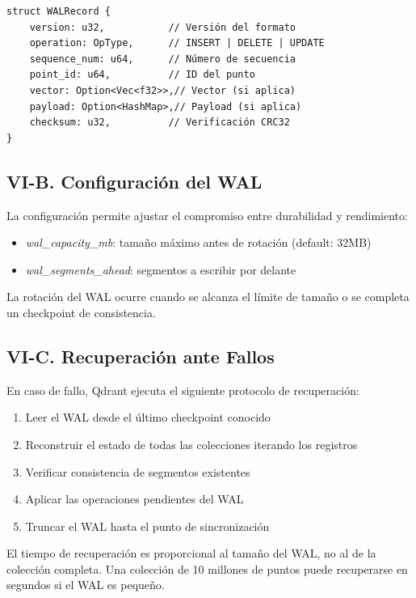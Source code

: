 \documentclass[conference]{IEEEtran}
\newcommand{\param}[1]{\textit{#1}}
\begin{document}
\begin{lstlisting}[caption={Estructura de registro WAL}]
struct WALRecord {
    version: u32,           // Versión del formato
    operation: OpType,      // INSERT | DELETE | UPDATE
    sequence_num: u64,      // Número de secuencia
    point_id: u64,          // ID del punto
    vector: Option<Vec<f32>>,// Vector (si aplica)
    payload: Option<HashMap>,// Payload (si aplica)
    checksum: u32,          // Verificación CRC32
}
\end{lstlisting}

\subsection{VI-B. Configuración del WAL}

La configuración permite ajustar el compromiso entre durabilidad y rendimiento:

\begin{itemize}
    \item \param{wal\_capacity\_mb}: tamaño máximo antes de rotación (default: 32MB)
    \item \param{wal\_segments\_ahead}: segmentos a escribir por delante
\end{itemize}

La rotación del WAL ocurre cuando se alcanza el límite de tamaño o se completa un checkpoint de consistencia.

\subsection{VI-C. Recuperación ante Fallos}

En caso de fallo, Qdrant ejecuta el siguiente protocolo de recuperación:

\begin{enumerate}
    \item Leer el WAL desde el último checkpoint conocido
    \item Reconstruir el estado de todas las colecciones iterando los registros
    \item Verificar consistencia de segmentos existentes
    \item Aplicar las operaciones pendientes del WAL
    \item Truncar el WAL hasta el punto de sincronización
\end{enumerate}

El tiempo de recuperación es proporcional al tamaño del WAL, no al de la colección completa. Una colección de 10 millones de puntos puede recuperarse en segundos si el WAL es pequeño.
\end{document}
